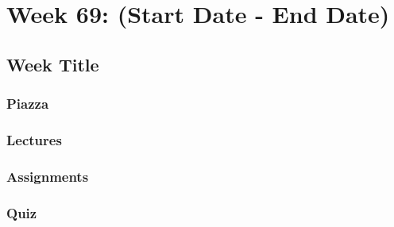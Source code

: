 \clearpage

\renewcommand{\ChapTitle}{Week 69: (Start Date - End Date)}
\renewcommand{\SectionTitle}{Week Title}

\chapter{\ChapTitle}

\section{\SectionTitle}

\subsection{Piazza}


\subsection{Lectures}





\subsection{Assignments}



\subsection{Quiz}

